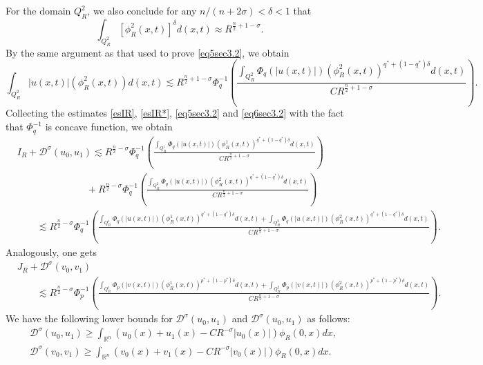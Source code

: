 \documentclass[11pt,reqno]{amsart}
\newcommand{\tron}[1]{\left( #1 \right)}
\numberwithin{equation}{section}
\newcommand{\dps}{\displaystyle}
\theoremstyle{plain}
\begin{document}
For the domain $Q^2_R$, we also conclude for any $n/(n+2\sigma)<\delta<1$ that
\begin{equation}\label{eq7sec3.1}
    \int_{Q^2_{R}}[\phi^2_R(x,t)]^{\delta}d(x, t)\approx R^{\frac{n}{2}+1-\sigma}. 
\end{equation}
By the same argument as that used to prove \eqref{eq5sec3.2}, we obtain
\begin{equation}\label{eq6sec3.2}
\int_{Q^2_{R}}|u(x, t)|\left(\phi^2_R(x, t)\right) d(x, t)\lesssim R^{\frac{n}{2}+1-\sigma} \Phi_q^{-1}\left(\frac{\dps\int_{Q^2_{R}} \Phi_q(|u(x, t)|)\left(\phi^2_R(x, t)\right)^{q^*+(1-q^*)\delta} d(x,t)}{CR^{\frac{n}{2}+1-\sigma}}\right).
\end{equation}
Collecting the estimates \eqref{esIR}, \eqref{esIR*}, \eqref{eq5sec3.2} and \eqref{eq6sec3.2} with the fact that $\Phi^{-1}_q$ is concave function, we obtain
\begin{align}
&I_R+\mathcal{D}^{\sigma}(u_0,u_1)\lesssim R^{\frac{n}{2}-\sigma} \Phi_q^{-1}\left(\frac{\dps\int_{Q^1_{R}} \Phi_q(|u(x, t)|)\left(\phi^1_R(x, t)\right)^{q^*+(1-q^*)\delta}d(x,t)}{CR^{\frac{n}{2}+1-\sigma}}\right) \nonumber \\
&\hspace{3cm}+R^{\frac{n}{2}-\sigma} \Phi_q^{-1}\left(\frac{\int_{Q^2_{R}} \Phi_q(|u(x, t)|)\left(\phi^2_R(x, t)\right)^{q^*+(1-q^*)\delta}d(x,t)}{CR^{\frac{n}{2}+1-\sigma}}\right) \nonumber \\
&\qquad\lesssim R^{\frac{n}{2}-\sigma}\Phi_q^{-1}\left(\frac{\dps\int_{Q^1_{R}} \Phi_q(|u(x, t)|)\left(\phi^1_R(x, t)\right)^{q^*+(1-q^*)\delta}d(x,t)+\int_{Q^2_{R}} \Phi_q(|u(x, t)|)\left(\phi^2_R(x, t)\right)^{q^*+(1-q^*)\delta}d(x,t)}{CR^{\frac{n}{2}+1-\sigma}}\right). \label{eq7sec3.2}
\end{align}
Analogously, one gets
\begin{equation}\label{eq8sec3.2}
\begin{aligned}
&J_R+\mathcal{D}^{\sigma}(v_0,v_1)\\
&\qquad \lesssim R^{\frac{n}{2}-\sigma}\Phi_p^{-1}\left(\frac{\dps\int_{Q^1_{R}} \Phi_p(|v(x, t)|)\left(\phi^1_R(x, t)\right)^{p^*+(1-p^*)\delta} d(x, t)+\dps\int_{Q^2_{R}} \Phi_p(|v(x, t)|)\left(\phi^2_R(x, t)\right)^{p^*+(1-p^*)\delta} d(x, t)}{CR^{\frac{n}{2}+1-\sigma}}\right).
\end{aligned}
\end{equation}
We have the following lower bounds for $\mathcal{D}^{\sigma}(u_0,u_1)$ and $\mathcal{D}^{\sigma}(u_0,u_1)$ as follows:
\begin{align*}
    &\mathcal{D}^{\sigma}(u_0,u_1)\geq\int_{\mathbb{R}^n}\tron{u_0(x)+u_1(x)-CR^{-\sigma}|u_0(x)|}\phi_{R}(0,x) dx,\\
    &\mathcal{D}^{\sigma}(v_0,v_1)\geq\int_{\mathbb{R}^n}\tron{v_0(x)+v_1(x)-CR^{-\sigma}|v_0(x)|}\phi_{R}(0,x) dx.
\end{align*}
\end{document}
